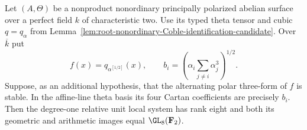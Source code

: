 \begin{theorem}
\label{thm:nonordinary-ppav-polar-stable-conditional-candidate}
Let $(A,\Theta)$ be a nonproduct nonordinary principally polarized
abelian surface over a perfect field $k$ of characteristic two.
Use its typed theta tensor and cubic $q=q_\alpha$ from
Lemma~\ref{lem:root-nonordinary-Coble-identification-candidate}.
Over $\overline k$ put
\[
 f(x)=q_{\alpha^{[1/2]}}(x),\qquad
 b_i=\left(\alpha_i\sum_{j\ne i}\alpha_j^3\right)^{1/2}.
\]
Suppose, as an additional hypothesis, that the alternating polar
three-form of $f$ is stable. In the affine-line theta basis its
four Cartan coefficients are precisely $b_i$.
Then the degree-one relative unit local system has rank eight and
both its geometric and arithmetic images equal $\GL_8(\mathbf F_2)$.
\end{theorem}
